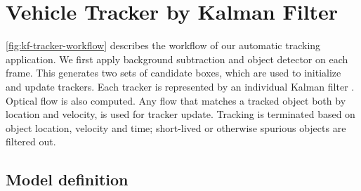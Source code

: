 \section{Vehicle Tracker by Kalman Filter}
\label{sec:tracker-kf}


\ref{fig:kf-tracker-workflow} describes the workflow of our automatic tracking application. We first apply background subtraction and object detector on each frame. This generates two sets of candidate boxes, which are used to initialize and update trackers. Each tracker is represented by an individual Kalman filter \cite{grewal2011kalman}. 
Optical flow is also computed. Any flow that matches a tracked object both by location and velocity, is used for tracker update. Tracking is terminated based on object location, velocity and time; short-lived or otherwise spurious objects are filtered out.

\subsection{Model definition}



